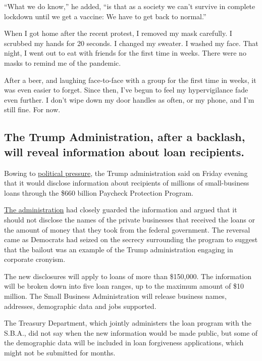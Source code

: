 ``What we do know,'' he added, ``is that as a society we can't survive
in complete lockdown until we get a vaccine: We have to get back to
normal.''

When I got home after the recent protest, I removed my mask carefully. I
scrubbed my hands for 20 seconds. I changed my sweater. I washed my
face. That night, I went out to eat with friends for the first time in
weeks. There were no masks to remind me of the pandemic.

After a beer, and laughing face-to-face with a group for the first time
in weeks, it was even easier to forget. Since then, I've begun to feel
my hypervigilance fade even further. I don't wipe down my door handles
as often, or my phone, and I'm still fine. For now.

\hypertarget{the-trump-administration-after-a-backlash-will-reveal-information-about-loan-recipients}{%
\subsection{The Trump Administration, after a backlash, will reveal
information about loan
recipients.}\label{the-trump-administration-after-a-backlash-will-reveal-information-about-loan-recipients}}

Bowing to
\href{https://www.nytimes.com/2020/06/15/us/politics/coronavirus-ppp-trump-congress.html}{political
pressure}, the Trump administration said on Friday evening that it would
disclose information about recipients of millions of small-business
loans through the \$660 billion Paycheck Protection Program.

\href{https://www.nytimes.com/aponline/2020/06/13/business/bc-us-virus-outbreak-loan-transparency.html}{The
administration} had closely guarded the information and argued that it
should not disclose the names of the private businesses that received
the loans or the amount of money that they took from the federal
government. The reversal came as Democrats had seized on the secrecy
surrounding the program to suggest that the bailout was an example of
the Trump administration engaging in corporate cronyism.

The new disclosures will apply to loans of more than \$150,000. The
information will be broken down into five loan ranges, up to the maximum
amount of \$10 million. The Small Business Administration will release
business names, addresses, demographic data and jobs supported.

The Treasury Department, which jointly administers the loan program with
the S.B.A., did not say when the new information would be made public,
but some of the demographic data will be included in loan forgiveness
applications, which might not be submitted for months.

